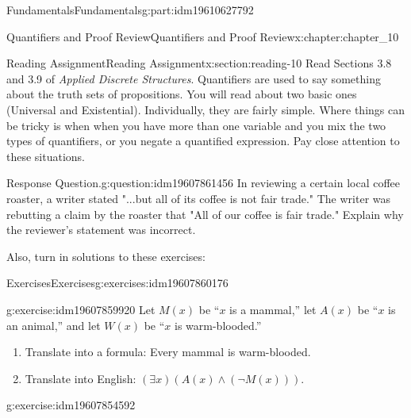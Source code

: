 \documentclass[oneside,10pt,]{book}
\numberwithin{equation}{section}
\begin{document}
\begin{partptx}{Fundamentals}{}{Fundamentals}{}{}{g:part:idm19610627792}
\typeout{************************************************}
%
\begin{chapterptx}{Quantifiers and Proof Review}{}{Quantifiers and Proof Review}{}{}{x:chapter:chapter_10}
\index{}%
%
%
\typeout{************************************************}
\typeout{************************************************}
%
\begin{sectionptx}{Reading Assignment}{}{Reading Assignment}{}{}{x:section:reading-10}
Read Sections 3.8 and 3.9 of \emph{Applied Discrete Structures}.  Quantifiers are used to say something about the truth sets of propositions.  You will read about two basic ones (Universal and Existential).  Individually, they are fairly simple.  Where things can be tricky is when when you have more than one variable and you mix the two types of quantifiers, or you negate a quantified expression.  Pay close attention to these situations.%
\begin{question}{Response Question.}{g:question:idm19607861456}%
In reviewing a certain local coffee roaster, a writer stated  "...but all of its coffee is not fair trade." The writer was rebutting a claim by the roaster that "All of our coffee is fair trade."  Explain why the reviewer's statement was incorrect.%
\end{question}
Also, turn in solutions to these exercises:%
%
%
\typeout{************************************************}
\typeout{************************************************}
%
\begin{exercises-subsection-numberless}{Exercises}{}{Exercises}{}{}{g:exercises:idm19607860176}
\par\medskip\noindent%
%
\begin{exercisegroup}
\begin{divisionexerciseeg}{1}{}{}{g:exercise:idm19607859920}%
Let \(M(x)\) be ``\(x\) is a mammal,'' let \(A(x)\) be ``\(x\) is an animal,'' and let \(W(x)\) be ``\(x\) is warm-blooded.''%
\par
%
\begin{enumerate}[label=(\alph*)]
\item{}Translate into a formula: Every mammal is warm-blooded.%
\item{}Translate into English: \((\exists x)(A(x) \land  (\neg M(x)))\).%
\end{enumerate}
%
\end{divisionexerciseeg}%
\begin{divisionexerciseeg}{2}{}{}{g:exercise:idm19607854592}%

\end{divisionexerciseeg}
\end{exercisegroup}
\end{exercises-subsection-numberless}
\end{sectionptx}
\end{chapterptx}
\end{partptx}
\end{document}
